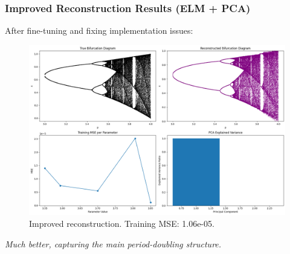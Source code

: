 \documentclass{beamer}
\begin{document}
\begin{frame}
    \frametitle{Improved Reconstruction Results (ELM + PCA)}
    After fine-tuning and fixing implementation issues:
     \begin{figure}
        \centering
        \includegraphics[width=0.8\linewidth]{figures/bd_1_results.png}
        \caption{Improved reconstruction. Training MSE: 1.06e-05.}
        \label{fig:bd_1_slide}
    \end{figure}
    \textit{Much better, capturing the main period-doubling structure.}
\end{frame}
\end{document}
